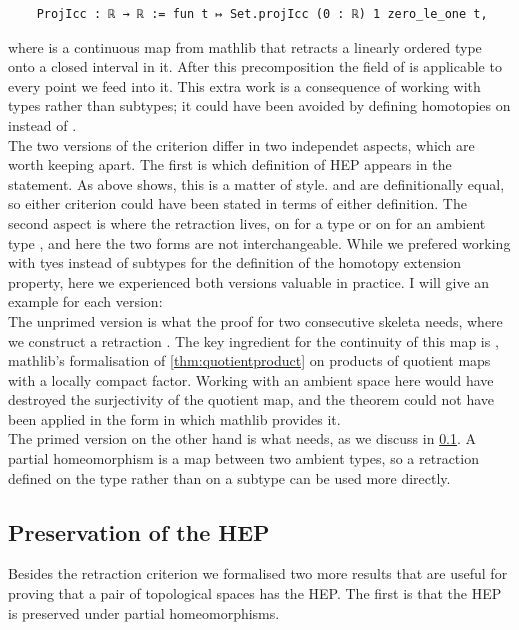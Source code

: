 \documentclass[11pt, a4paper, english]{article}
\theoremstyle{plain}
\theoremstyle{definition}
\theoremstyle{remark}
\numberwithin{equation}{section}
\numberwithin{theorem}{section}
\begin{document}
\begin{verbatim}
    ProjIcc : ℝ → ℝ := fun t ↦ Set.projIcc (0 : ℝ) 1 zero_le_one t,
\end{verbatim} 
where  is a continuous map from mathlib that retracts a linearly ordered type onto a closed interval in it. After this precomposition the  field of  is applicable to every point we feed into it. This extra work is a consequence of working with types rather than subtypes; it could have been avoided by defining homotopies on  instead of .\\ 
The two versions of the criterion differ in two independet aspects, which are worth keeping apart. The first is which definition of HEP appears in the statement. As  above shows, this is a matter of style.  and  are definitionally equal, so either criterion could have been stated in terms of either definition. The second aspect is where the retraction lives, on  for a type  or on  for an ambient type , and here the two forms are not interchangeable. While we prefered working with tyes instead of subtypes for the definition of the homotopy extension property, here we experienced both versions valuable in practice. I will give an example for each version: \\
The unprimed version  is what the proof for two consecutive skeleta needs, where we construct a retraction . The key ingredient for the continuity of this map is , mathlib's formalisation of \cref{thm:quotientproduct} on products of quotient maps with a locally compact factor. Working with an ambient space here would have destroyed the surjectivity of the quotient map, and the theorem could not have been applied in the form in which mathlib provides it. \\
The primed version on the other hand is what  needs, as we discuss in \cref{subsec:lean:preservation}. A partial homeomorphism is a map between two ambient types, so a retraction defined on the type rather than on a subtype can be used more directly.  


\subsection{Preservation of the HEP}  \label{subsec:lean:preservation}
Besides the retraction criterion we formalised two more results that are useful for proving that a pair of topological spaces has the HEP. The first is that the HEP is preserved under partial homeomorphisms.  \\
\end{document}
